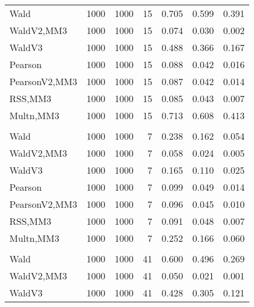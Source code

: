 \documentclass[
]{article}
\begin{document}
\begin{table}[H]
{\begin{tabular}[t]{lrrrrrr}
\hspace{1em}Wald & 1000 & 1000 & 15 & 0.705 & 0.599 & 0.391\\
\hspace{1em}WaldV2,MM3 & 1000 & 1000 & 15 & 0.074 & 0.030 & 0.002\\
\hspace{1em}WaldV3 & 1000 & 1000 & 15 & 0.488 & 0.366 & 0.167\\
\hspace{1em}Pearson & 1000 & 1000 & 15 & 0.088 & 0.042 & 0.016\\
\hspace{1em}PearsonV2,MM3 & 1000 & 1000 & 15 & 0.087 & 0.042 & 0.014\\
\hspace{1em}RSS,MM3 & 1000 & 1000 & 15 & 0.085 & 0.043 & 0.007\\
\hspace{1em}Multn,MM3 & 1000 & 1000 & 15 & 0.713 & 0.608 & 0.413\\
\addlinespace[0.3em]
\multicolumn{7}{l}{\textbf{2F 10V}}\\
\hspace{1em}Wald & 1000 & 1000 & 7 & 0.238 & 0.162 & 0.054\\
\hspace{1em}WaldV2,MM3 & 1000 & 1000 & 7 & 0.058 & 0.024 & 0.005\\
\hspace{1em}WaldV3 & 1000 & 1000 & 7 & 0.165 & 0.110 & 0.025\\
\hspace{1em}Pearson & 1000 & 1000 & 7 & 0.099 & 0.049 & 0.014\\
\hspace{1em}PearsonV2,MM3 & 1000 & 1000 & 7 & 0.096 & 0.045 & 0.010\\
\hspace{1em}RSS,MM3 & 1000 & 1000 & 7 & 0.091 & 0.048 & 0.007\\
\hspace{1em}Multn,MM3 & 1000 & 1000 & 7 & 0.252 & 0.166 & 0.060\\
\addlinespace[0.3em]
\multicolumn{7}{l}{\textbf{3F 15V}}\\
\hspace{1em}Wald & 1000 & 1000 & 41 & 0.600 & 0.496 & 0.269\\
\hspace{1em}WaldV2,MM3 & 1000 & 1000 & 41 & 0.050 & 0.021 & 0.001\\
\hspace{1em}WaldV3 & 1000 & 1000 & 41 & 0.428 & 0.305 & 0.121\\

\end{tabular}}
\end{table}
\end{document}
